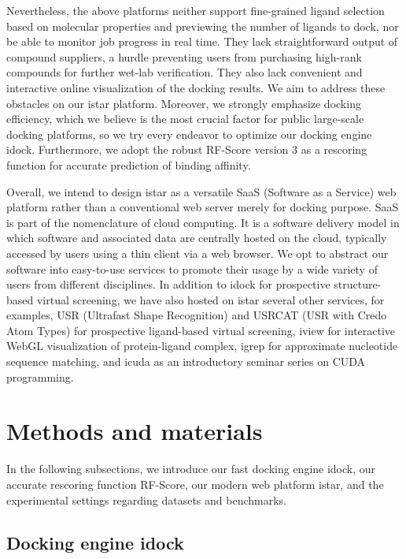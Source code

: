 Nevertheless, the above platforms neither support fine-grained ligand selection based on molecular properties and previewing the number of ligands to dock, nor be able to monitor job progress in real time. They lack straightforward output of compound suppliers, a hurdle preventing users from purchasing high-rank compounds for further wet-lab verification. They also lack convenient and interactive online visualization of the docking results. We aim to address these obstacles on our istar platform. Moreover, we strongly emphasize docking efficiency, which we believe is the most crucial factor for public large-scale docking platforms, so we try every endeavor to optimize our docking engine idock. Furthermore, we adopt the robust RF-Score \citep{564} version 3 as a rescoring function for accurate prediction of binding affinity.

Overall, we intend to design istar as a versatile SaaS (Software as a Service) web platform rather than a conventional web server merely for docking purpose. SaaS is part of the nomenclature of cloud computing. It is a software delivery model in which software and associated data are centrally hosted on the cloud, typically accessed by users using a thin client via a web browser. We opt to abstract our software into easy-to-use services to promote their usage by a wide variety of users from different disciplines. In addition to idock for prospective structure-based virtual screening, we have also hosted on istar several other services, for examples, USR (Ultrafast Shape Recognition) \citep{1379} and USRCAT (USR with Credo Atom Types) \citep{1331} for prospective ligand-based virtual screening, iview \citep{1366} for interactive WebGL visualization of protein-ligand complex, igrep \citep{1138} for approximate nucleotide sequence matching, and icuda as an introductory seminar series on CUDA programming.

\section{Methods and materials}

In the following subsections, we introduce our fast docking engine idock, our accurate rescoring function RF-Score, our modern web platform istar, and the experimental settings regarding datasets and benchmarks.

\subsection{Docking engine idock}

